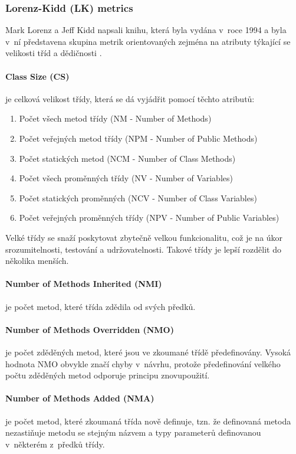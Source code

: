 \documentclass[11pt,twoside,a4paper]{book}
\begin{document}
\subsubsection{Lorenz-Kidd (LK) metrics}
\label{sec:LK}
Mark Lorenz a Jeff Kidd napsali knihu, která byla vydána v~roce 1994 a byla v~ní představena skupina metrik
orientovaných zejména na atributy týkající se velikosti tříd a dědičnosti \cite{LKaMOODextra}.

\paragraph{Class Size (CS)} je celková velikost třídy, která se dá vyjádřit pomocí těchto atributů:
\begin{enumerate}
\item Počet všech metod třídy (NM - Number of Methods)
\item Počet veřejných metod třídy (NPM - Number of Public Methods)
\item Počet statických metod (NCM - Number of Class Methods)
\item Počet všech proměnných třídy (NV - Number of Variables)
\item Počet statických proměnných (NCV - Number of Class Variables)
\item Počet veřejných proměnných třídy (NPV - Number of Public Variables)
\end{enumerate}

Velké třídy se snaží poskytovat zbytečně velkou funkcionalitu, což je na úkor srozumitelnosti, testování a udržovatelnosti.
Takové třídy je lepší rozdělit do několika menších.

\paragraph{Number of Methods Inherited (NMI)} je počet metod, které třída zdědila od svých předků.

\paragraph{Number of Methods Overridden (NMO)} je počet zděděných metod,
které jsou ve zkoumané třídě předefinovány. Vysoká hodnota NMO obvykle značí chyby v~návrhu,
protože předefinování velkého počtu zděděných metod odporuje principu znovupoužití.

\paragraph{Number of Methods Added (NMA)} je počet metod, které zkoumaná třída nově definuje, tzn.
že definovaná metoda nezastiňuje metodu se stejným názvem a typy parameterů definovanou v~některém z~předků třídy.
\end{document}
